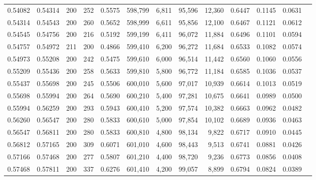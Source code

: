 \begin{tabular}{rrrrrrrrrrrrr}
0.54082 & 0.54314 &    200 & 252 &                                     0.5575 & 598,799 &   6,811 &  95,596 &  12,360 & 0.6447 & 0.1145 & 0.0631 \\
0.54314 & 0.54543 &    200 & 260 &                                     0.5652 & 598,999 &   6,611 &  95,856 &  12,100 & 0.6467 & 0.1121 & 0.0612 \\
0.54545 & 0.54756 &    200 & 216 &                                     0.5192 & 599,199 &   6,411 &  96,072 &  11,884 & 0.6496 & 0.1101 & 0.0594 \\
0.54757 & 0.54972 &    211 & 200 &                                     0.4866 & 599,410 &   6,200 &  96,272 &  11,684 & 0.6533 & 0.1082 & 0.0574 \\
0.54973 & 0.55208 &    200 & 242 &                                     0.5475 & 599,610 &   6,000 &  96,514 &  11,442 & 0.6560 & 0.1060 & 0.0556 \\
0.55209 & 0.55436 &    200 & 258 &                                     0.5633 & 599,810 &   5,800 &  96,772 &  11,184 & 0.6585 & 0.1036 & 0.0537 \\
0.55437 & 0.55698 &    200 & 245 &                                     0.5506 & 600,010 &   5,600 &  97,017 &  10,939 & 0.6614 & 0.1013 & 0.0519 \\
0.55698 & 0.55994 &    200 & 264 &                                     0.5690 & 600,210 &   5,400 &  97,281 &  10,675 & 0.6641 & 0.0989 & 0.0500 \\
0.55994 & 0.56259 &    200 & 293 &                                     0.5943 & 600,410 &   5,200 &  97,574 &  10,382 & 0.6663 & 0.0962 & 0.0482 \\
0.56260 & 0.56547 &    200 & 280 &                                     0.5833 & 600,610 &   5,000 &  97,854 &  10,102 & 0.6689 & 0.0936 & 0.0463 \\
0.56547 & 0.56811 &    200 & 280 &                                     0.5833 & 600,810 &   4,800 &  98,134 &   9,822 & 0.6717 & 0.0910 & 0.0445 \\
0.56812 & 0.57165 &    200 & 309 &                                     0.6071 & 601,010 &   4,600 &  98,443 &   9,513 & 0.6741 & 0.0881 & 0.0426 \\
0.57166 & 0.57468 &    200 & 277 &                                     0.5807 & 601,210 &   4,400 &  98,720 &   9,236 & 0.6773 & 0.0856 & 0.0408 \\
0.57468 & 0.57811 &    200 & 337 &                                     0.6276 & 601,410 &   4,200 &  99,057 &   8,899 & 0.6794 & 0.0824 & 0.0389 \\

\end{tabular}
